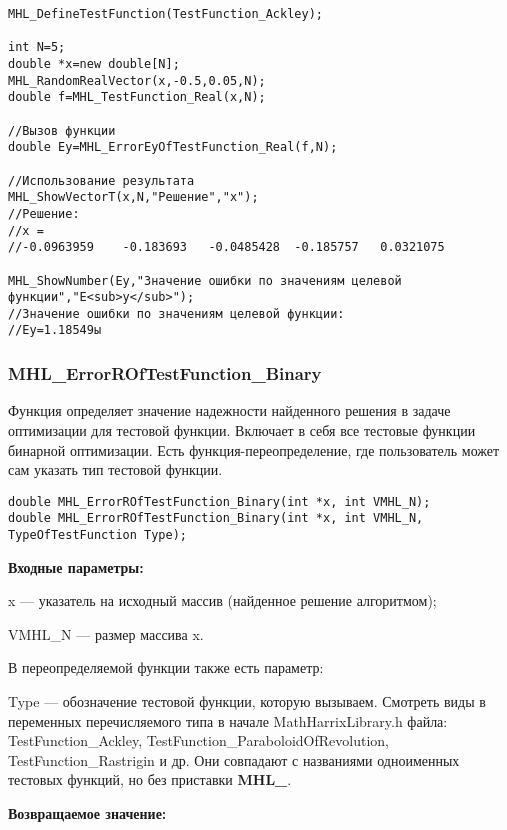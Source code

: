\documentclass[a4paper,12pt]{article}
\begin{document}
\begin{lstlisting}[label=code_use_MHL_ErrorEyOfTestFunction_Real,caption=Пример использования]
MHL_DefineTestFunction(TestFunction_Ackley);

int N=5;
double *x=new double[N];
MHL_RandomRealVector(x,-0.5,0.05,N);
double f=MHL_TestFunction_Real(x,N);

//Вызов функции
double Ey=MHL_ErrorEyOfTestFunction_Real(f,N);

//Использование результата
MHL_ShowVectorT(x,N,"Решение","x");
//Решение:
//x =
//-0.0963959	-0.183693	-0.0485428	-0.185757	0.0321075

MHL_ShowNumber(Ey,"Значение ошибки по значениям целевой функции","E<sub>y</sub>");
//Значение ошибки по значениям целевой функции:
//Ey=1.18549ы
\end{lstlisting}

\subsubsection{MHL\_ErrorROfTestFunction\_Binary}\label{MHL_ErrorROfTestFunction_Binary}

Функция определяет значение надежности найденного решения в задаче оптимизации для тестовой функции. Включает в себя все тестовые функции бинарной оптимизации. Есть функция-переопределение, где пользователь может сам указать тип тестовой функции.


\begin{lstlisting}[label=code_syntax_MHL_ErrorROfTestFunction_Binary,caption=Синтаксис]
double MHL_ErrorROfTestFunction_Binary(int *x, int VMHL_N);
double MHL_ErrorROfTestFunction_Binary(int *x, int VMHL_N, TypeOfTestFunction Type);
\end{lstlisting}

\textbf{Входные параметры:}

x --- указатель на исходный массив (найденное решение алгоритмом);

VMHL\_N --- размер массива x.

В переопределяемой функции также есть параметр:
  
Type --- обозначение тестовой функции, которую вызываем.
Смотреть виды в переменных перечисляемого типа в начале MathHarrixLibrary.h файла: TestFunction\_Ackley, TestFunction\_ParaboloidOfRevolution, TestFunction\_Rastrigin и др. Они совпадают с названиями одноименных тестовых функций, но без приставки \textbf{MHL\_}.

\textbf{Возвращаемое значение:}
 
\end{document}

